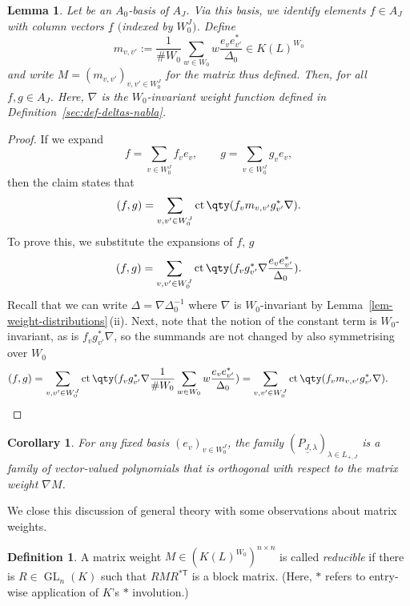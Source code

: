 \documentclass[10pt,a4paper]{amsart}
\newtheorem{Lemma}[Theorem]{Lemma}
\newtheorem{Corollary}[Theorem]{Corollary}
\theoremstyle{definition}
\newtheorem{Definition}[Theorem]{Definition}
\numberwithin{equation}{section}
\begin{document}
\begin{Lemma}\label{sec:lem-matrix-weight}
 Let  be an $A_0$-basis of $A_J$. Via this basis, we identify
 elements $f\in A_J$ with column vectors $\underline{f}$ $\big($indexed by $W_0^J\big)$. Define
 \[
 m_{v,v'} := \frac{1}{\#W_0} \sum_{w\in W_0} w\frac{e_v e_{v'}^*}{\Delta_0} \in K(L)^{W_0}
 \]
 and write $M=(m_{v,v'})_{v,v'\in W_0^J}$ for the matrix thus defined. Then,
 for all $f,g\in A_J$. Here, $\nabla$ is the $W_0$-invariant weight
 function defined in Definition~{\rm \ref{sec:def-deltas-nabla}}.
\end{Lemma}
\begin{proof}
 If we expand
 \[
 f = \sum_{v\in W_0^J} f_v e_v, \qquad g = \sum_{v\in W_0^J} g_v e_v,
 \]
 then the claim states that
 \[
 (f,g) = \sum_{v,v'\in W_0^J} \operatorname{ct}\qty(f_v m_{v,v'} g_{v'}^*\nabla).
 \]
 To prove this, we substitute the expansions of $f$, $g$
 \[
 (f,g) = \sum_{v,v'\in W_0^J} \operatorname{ct}\qty(f_v g_{v'}^*
 \nabla \frac{e_v e_{v'}^*}{\Delta_0}).
 \]
 Recall that we can write $\Delta=\nabla\Delta_0^{-1}$ where $\nabla$ is
 $W_0$-invariant by Lemma~\ref{lem-weight-distributions}\,(ii).
 Next, note that the notion of the constant term is $W_0$-invariant, as is
 $f_v g_{v'}^*\nabla$, so the summands are not changed by also symmetrising over
 $W_0$
 \[
 (f,g) = \sum_{v,v'\in W_0^J} \operatorname{ct}\qty(
 f_v g_{v'}^*\nabla \frac{1}{\#W_0} \sum_{w\in W_0} w \frac{e_v e_{v'}^*}{\Delta_0})
 = \sum_{v,v'\in W_0^J} \operatorname{ct}\qty(f_v m_{v,v'} g_{v'}^* \nabla).\tag*{\qed}
 \] \renewcommand{\qed}{}
\end{proof}

\begin{Corollary}
 For any fixed basis $(e_v)_{v\in W_0^J}$, the family
 $(\underline{P_{J,\lambda}})_{\lambda\in L_{+,J}}$ is a family of vector-valued polynomials
 that is orthogonal with respect to the matrix weight $\nabla M$.
\end{Corollary}

We close this discussion of general theory with some observations about
matrix weights.

\begin{Definition}
 A matrix weight $M\in (K(L)^{W_0})^{n\times n}$ is called \emph{reducible} if there is
 $R\in\operatorname{GL}_n(K)$ such that $R M R^{*{\mathsf T}}$ is a block matrix.
(Here, $*$ refers to entry-wise application of $K$'s $*$ involu\-tion.)
\end{Definition}
\end{document}
